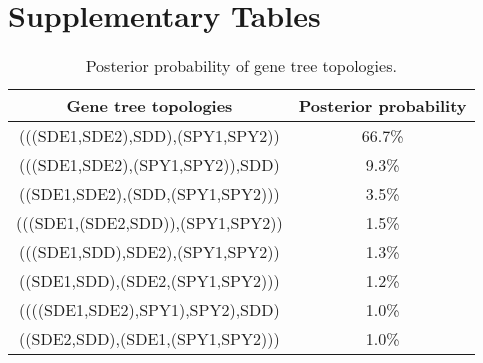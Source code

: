 \documentclass[english]{article}
\providecommand{\tabularnewline}{\\}
\begin{document}
\clearpage{}\setcounter{figure}{0}
\setcounter{table}{0}
\renewcommand{\figurename}{Supplementary Figure}
\renewcommand{\tablename}{Supplementary Table}

\section*{Supplementary Tables}
\clearpage{}

\begin{table}
\caption{\label{tab:Gene-tree-topologies}Posterior probability of gene tree
topologies.}
\begin{tabular}{|c|c|}
\hline 
Gene tree topologies & Posterior probability\tabularnewline
\hline
\hline 
(((SDE1,SDE2),SDD),(SPY1,SPY2)) & 66.7\%\tabularnewline
\hline 
(((SDE1,SDE2),(SPY1,SPY2)),SDD) & 9.3\%\tabularnewline
\hline 
((SDE1,SDE2),(SDD,(SPY1,SPY2))) & 3.5\%\tabularnewline
\hline 
(((SDE1,(SDE2,SDD)),(SPY1,SPY2)) & 1.5\%\tabularnewline
\hline 
(((SDE1,SDD),SDE2),(SPY1,SPY2)) & 1.3\%\tabularnewline
\hline 
((SDE1,SDD),(SDE2,(SPY1,SPY2))) & 1.2\%\tabularnewline
\hline 
((((SDE1,SDE2),SPY1),SPY2),SDD) & 1.0\%\tabularnewline
\hline 
((SDE2,SDD),(SDE1,(SPY1,SPY2))) & 1.0\%\tabularnewline
\hline
\end{tabular}
\end{table}
\clearpage{}
\end{document}

